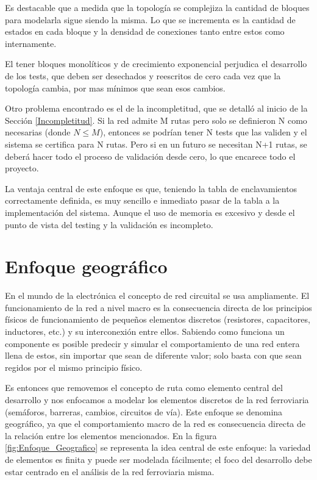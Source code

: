 	Es destacable que a medida que la topología se complejiza la cantidad de bloques para modelarla sigue siendo la misma. Lo que se incrementa es la cantidad de estados en cada bloque y la densidad de conexiones tanto entre estos como internamente.
	
	El tener bloques monolíticos y de crecimiento exponencial perjudica el desarrollo de los tests, que deben ser desechados y reescritos de cero cada vez que la topología cambia, por mas mínimos que sean esos cambios. 
	
	Otro problema encontrado es el de la incompletitud, que se detalló al inicio de la Sección \ref{Incompletitud}. Si la red admite M rutas pero solo se definieron N como necesarias (donde $N \leq M$), entonces se podrían tener N tests que las validen y el sistema se certifica para N rutas. Pero si en un futuro se necesitan N+1 rutas, se deberá hacer todo el proceso de validación desde cero, lo que encarece todo el proyecto.
			
	La ventaja central de este enfoque es que, teniendo la tabla de enclavamientos correctamente definida, es muy sencillo e inmediato pasar de la tabla a la implementación del sistema. Aunque el uso de memoria es excesivo y desde el punto de vista del testing y la validación es incompleto.			
					
\section{Enfoque geográfico}

	En el mundo de la electrónica el concepto de red circuital se usa ampliamente. El funcionamiento de la red a nivel macro es la consecuencia directa de los principios físicos de funcionamiento de pequeños elementos discretos (resistores, capacitores, inductores, etc.) y su interconexión entre ellos. Sabiendo como funciona un componente es posible predecir y simular el comportamiento de una red entera llena de estos, sin importar que sean de diferente valor; solo basta con que sean regidos por el mismo principio físico.
	
	Es entonces que removemos el concepto de ruta como elemento central del desarrollo y nos enfocamos a modelar los elementos discretos de la red ferroviaria (semáforos, barreras, cambios, circuitos de vía). Este enfoque se denomina geográfico, ya que el comportamiento macro de la red es consecuencia directa de la relación entre los elementos mencionados. En la figura \ref{fig:Enfoque_Geografico} se representa la idea central de este enfoque: la variedad de elementos es finita y puede ser modelada fácilmente; el foco del desarrollo debe estar centrado en el análisis de la red ferroviaria misma.
	

